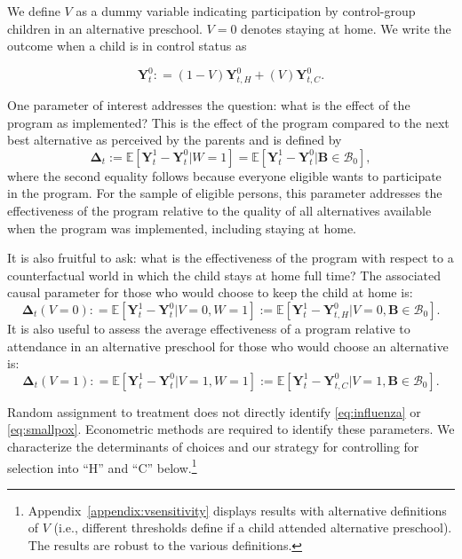 We define $V$ as a dummy variable indicating participation by control-group children in an alternative preschool. $V=0$ denotes staying at home. We write the outcome when a child is in control status as

\begin{equation}
\bm{Y}^0_t : = \left( 1 - V \right) \bm{Y}^0_{t,H} + \left( V \right) \bm{Y}^0_{t,C}. \label{eq:meandiff}
\end{equation}

One parameter of interest addresses the question: what is the effect of the program as implemented? This is the effect of the program compared to the next best alternative as perceived by the parents and is defined by
\begin{equation}\label{eq:effect}
\bm{\Delta}_t := \mathbb{E} \left[ \bm{Y}^1_t -  \bm{Y}^0_t | W =1 \right] = \mathbb{E} \left[\bm{Y}^1_t - \bm{Y}^0_t | \bm{B} \in \mathcal{B}_0 \right],
\end{equation}
where the second equality follows because everyone eligible wants to participate in the program. For the sample of eligible persons, this parameter addresses the effectiveness of the program relative to the quality of all alternatives available when the program was implemented, including staying at home.

It is also fruitful to ask: what is the effectiveness of the program with respect to a counterfactual world in which the child stays at home full time? The associated causal parameter for those who would choose to keep the child at home is:
\begin{equation}\label{eq:influenza}
\bm{\Delta}_t \left(V = 0 \right) : =   \mathbb{E} \left[ \bm{Y}^1_t - \bm{Y}^0_t | V = 0, W = 1 \right] := \mathbb{E} \left[\bm{Y}^1_{t} - \bm{Y}^0_{t,H} | V = 0, \bm{B} \in \mathcal{B}_0 \right].
\end{equation}
It is also useful to assess the average effectiveness of a program relative to attendance in an alternative preschool for those who would choose an alternative is:
\begin{equation}\label{eq:smallpox}
\bm{\Delta}_t \left( V =1 \right) : =   \mathbb{E} \left[ \bm{Y}^1_t - \bm{Y}^0_t | V = 1, W = 1 \right] := \mathbb{E} \left[\bm{Y}^1_t - \bm{Y}^0_{t,C} | V = 1, \bm{B} \in \mathcal{B}_0 \right].
\end{equation}

Random assignment to treatment does not directly identify \eqref{eq:influenza} or \eqref{eq:smallpox}. Econometric methods are required to identify these parameters. We characterize the determinants of choices and our strategy for controlling for selection into ``H'' and ``C'' below.\footnote{Appendix~\ref{appendix:vsensitivity} displays results with alternative definitions of $V$ (i.e., different thresholds define if a child attended alternative preschool). The results are robust to the various definitions.}

